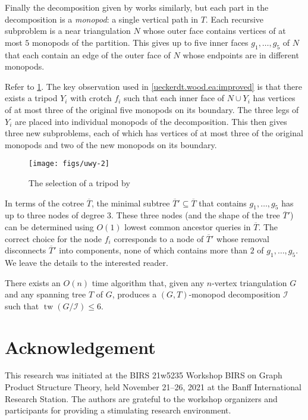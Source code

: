 \documentclass{patmorin}
\DeclareMathOperator{\tw}{tw}
\begin{document}
Finally the decomposition given by \citet{ueckerdt.wood.ea:improved} works similarly, but each part in the decomposition is a \emph{monopod}: a single vertical path in $T$. Each recursive subproblem is a near triangulation $N$ whose outer face contains vertices of at most $5$ monopods of the partition. This gives up to five inner faces $g_1,\ldots,g_5$ of $N$ that each contain an edge of the outer face of $N$ whose endpoints are in different monopods.

Refer to \cref{uwy}.
The key observation used in \cref{ueckerdt.wood.ea:improved} is that there exists a tripod $Y_i$ with crotch $f_i$ such that each inner face of $N\cup Y_i$ has vertices of at most three of the original five monopods on its boundary.  The three legs of $Y_i$ are placed into individual monopods of the decomposition.  This then gives three new subproblems, each of which has vertices of at most three of the original monopods and two of the new monopods on its boundary.

\begin{figure}
  \begin{center}
    \texttt{[image: figs/uwy-2]}
  \end{center}
  \caption{The selection of a tripod by \citet{ueckerdt.wood.ea:improved}}
  \label{uwy}
\end{figure}

In terms of the cotree $\overline{T}$, the minimal subtree $\overline{T}'\subseteq\overline{T}$ that contains $g_1,\ldots,g_5$ has up to three nodes of degree $3$.  These three nodes (and the shape of the tree $\overline{T}'$) can be determined using $O(1)$ lowest common ancestor queries in $\overline{T}$.  The correct choice for the node $f_i$ corresponds to a node of $\overline{T}'$ whose removal disconnects $\overline{T}'$ into components, none of which contains more than $2$ of $g_1,\ldots,g_5$.  We leave the details to the interested reader.

\begin{thm}
  There exists an $O(n)$ time algorithm that, given any $n$-vertex triangulation $G$ and any spanning tree $T$ of $G$, produces a $(G,T)$-monopod decomposition $\mathcal{I}$ such that $\tw(G/\mathcal{I})\le 6$.
\end{thm}


\section*{Acknowledgement}

This research was initiated at the BIRS 21w5235 Workshop BIRS on Graph Product Structure Theory, held November 21--26, 2021 at the Banff International Research Station.  The authors are grateful to the workshop organizers and participants for providing a stimulating research environment.




\end{document}
